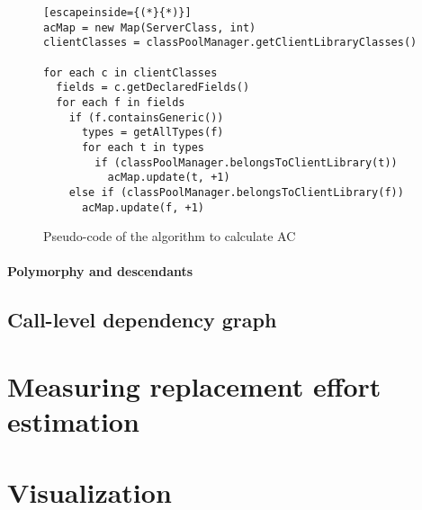 \begin{figure}[ht!]
\begin{lstlisting}[escapeinside={(*}{*)}]
acMap = new Map(ServerClass, int)
clientClasses = classPoolManager.getClientLibraryClasses()

for each c in clientClasses
  fields = c.getDeclaredFields()
  for each f in fields
    if (f.containsGeneric())
      types = getAllTypes(f)
      for each t in types
        if (classPoolManager.belongsToClientLibrary(t))
          acMap.update(t, +1)
    else if (classPoolManager.belongsToClientLibrary(f))
      acMap.update(f, +1)
\end{lstlisting}
\caption{Pseudo-code of the algorithm to calculate AC}
\label{fig:algorithm-ac}
\end{figure}

\paragraph{Polymorphy and descendants}


\subsection{Call-level dependency graph}


\section{Measuring replacement effort estimation}

\section{Visualization}
